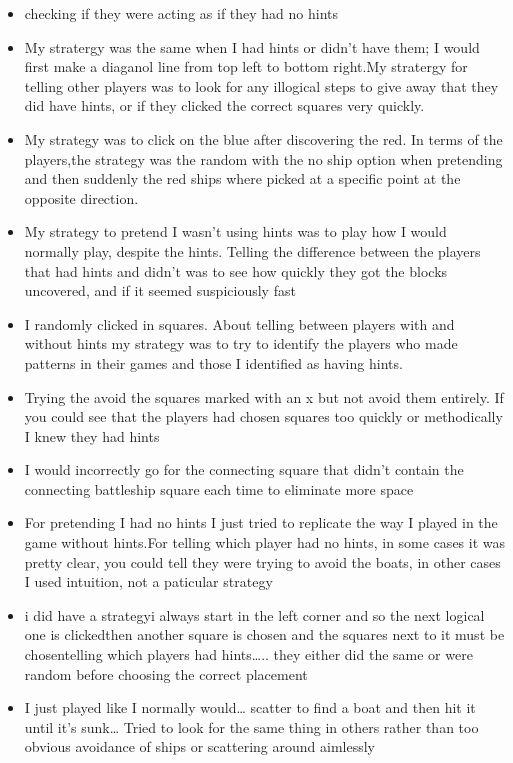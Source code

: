 \documentclass[
  english,
  man]{apa6}
\begin{document}
\begin{itemize}
  no
\item
  checking if they were acting as if they had no hints
\item
  My stratergy was the same when I had hints or didn't have them; I would first make a diaganol line from top left to bottom right.My stratergy for telling other players was to look for any illogical steps to give away that they did have hints, or if they clicked the correct squares very quickly.
\item
  My strategy was to click on the blue after discovering the red. In terms of the players,the strategy was the random with the no ship option when pretending and then suddenly the red ships where picked at a specific point at the opposite direction.
\item
  My strategy to pretend I wasn't using hints was to play how I would normally play, despite the hints. Telling the difference between the players that had hints and didn't was to see how quickly they got the blocks uncovered, and if it seemed suspiciously fast
\item
  I randomly clicked in squares. About telling between players with and without hints my strategy was to try to identify the players who made patterns in their games and those I identified as having hints.
\item
  Trying the avoid the squares marked with an x but not avoid them entirely. If you could see that the players had chosen squares too quickly or methodically I knew they had hints
\item
  I would incorrectly go for the connecting square that didn't contain the connecting battleship square each time to eliminate more space
\item
  For pretending I had no hints I just tried to replicate the way I played in the game without hints.For telling which player had no hints, in some cases it was pretty clear, you could tell they were trying to avoid the boats, in other cases I used intuition, not a paticular strategy
\item
  i did have a strategyi always start in the left corner and so the next logical one is clickedthen another square is chosen and the squares next to it must be chosentelling which players had hints\ldots.. they either did the same or were random before choosing the correct placement
\item
  I just played like I normally would\ldots{} scatter to find a boat and then hit it until it's sunk\ldots{} Tried to look for the same thing in others rather than too obvious avoidance of ships or scattering around aimlessly

\end{itemize}
\end{document}
